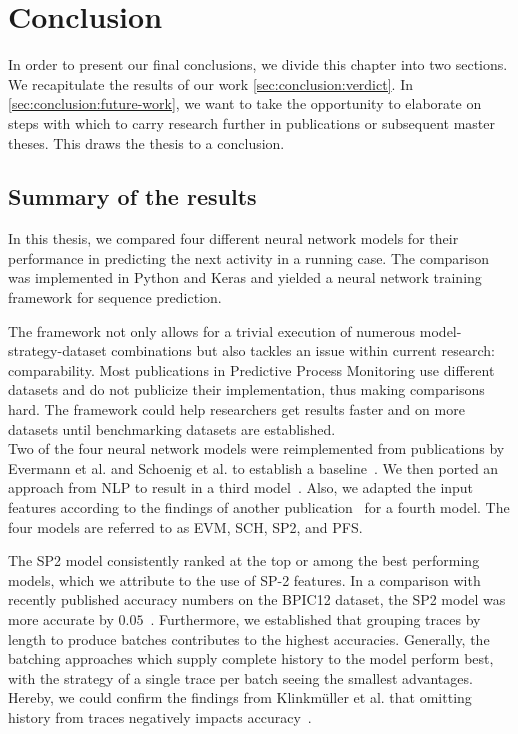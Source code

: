 \chapter{Conclusion} \label{chap:conclusion}
In order to present our final conclusions, we divide this chapter into two sections.
We recapitulate the results of our work \autoref{sec:conclusion:verdict}.
In \autoref{sec:conclusion:future-work}, we want to take the opportunity to elaborate on steps with which to carry research further in publications or subsequent master theses. This draws the thesis to a conclusion.

\section{Summary of the results} \label{sec:conclusion:verdict}
In this thesis, we compared four different neural network models for their performance in predicting the next activity in a running case. The comparison was implemented in Python and Keras and yielded a neural network training framework for sequence prediction.

The framework not only allows for a trivial execution of numerous model-strategy-dataset combinations but also tackles an issue within current research: comparability. Most publications in Predictive Process Monitoring use different datasets and do not publicize their implementation, thus making comparisons hard. The framework could help researchers get results faster and on more datasets until benchmarking datasets are established.\\

Two of the four neural network models were reimplemented from publications by Evermann et al. and Schoenig et al. to establish a baseline~\cite{evermann2016, schoenig2018}. We then ported an approach from NLP to result in a third model~\cite{shibata2016bipartite}. Also, we adapted the input features according to the findings of another publication~\cite{klinkmuller2018reliablemonitoring} for a fourth model. The four models are referred to as EVM, SCH, SP2, and PFS.

The SP2 model consistently ranked at the top or among the best performing models, which we attribute to the use of SP-2 features. In a comparison with recently published accuracy numbers on the BPIC12 dataset, the SP2 model was more accurate by $0.05$~\cite{boehmer2018probability, evermann2016}. Furthermore, we established that grouping traces by length to produce batches contributes to the highest accuracies. Generally, the batching approaches which supply complete history to the model perform best, with the strategy of a single trace per batch seeing the smallest advantages. Hereby, we could confirm the findings from Klinkmüller et al. that omitting history from traces negatively impacts accuracy~\cite{klinkmuller2018reliablemonitoring}.

